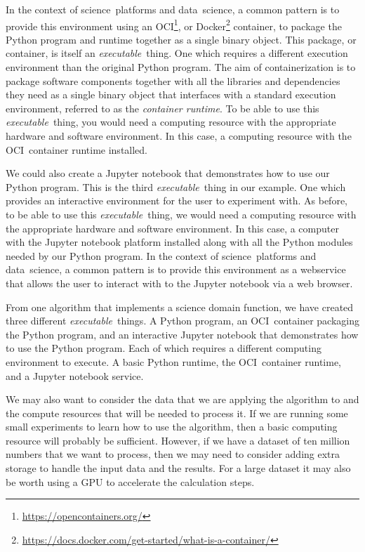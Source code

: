 \documentclass[11pt,a4paper]{ivoa}
\newcommand{\webservice} {webservice}
\newcommand{\webbrowser} {web browser}
\newcommand{\jupyternotebook} {Jupyter notebook}
\newcommand{\python} {Python}
\newcommand{\pythonprogram} {Python program}
\newcommand{\ocicontainer} {OCI~container}
\newcommand{\footurl}[1] {\footnote{\url{#1}}}
\newcommand{\dataset} {dataset}
\newcommand{\datascience} {data~science}
\newcommand{\scienceplatform} {science~platform}
\newcommand{\executablething} {\textit{executable}~thing}
\newcommand{\gpu} {GPU}
\begin{document}
In the context of \scienceplatform{}s and \datascience{}, a common pattern is to provide this environment
using an OCI\footurl{https://opencontainers.org/},
or Docker\footurl{https://docs.docker.com/get-started/what-is-a-container/} container,
to package the \pythonprogram{} and runtime together as a single binary object.
This package, or container, is itself an \executablething{}. One which requires a different execution
environment than the original \pythonprogram{}.
The aim of containerization is to package software components together with all the libraries and dependencies
they need as a single binary object that interfaces with a standard execution environment,
referred to as the \textit{container runtime}.
To be able to use this \executablething{}, you would need a computing resource with the appropriate
hardware and software environment. In this case, a computing resource with the \ocicontainer{} runtime installed.

We could also create a \jupyternotebook{} that demonstrates how to use our \pythonprogram{}.
This is the third \executablething{} in our example.
One which provides an interactive environment for the user to experiment with.
As before, to be able to use this \executablething{}, we would need a computing resource with
the appropriate hardware and software environment.
In this case, a computer with the \jupyternotebook{} platform installed along with all the \python{} modules
needed by our \pythonprogram{}.
In the context of \scienceplatform{}s and \datascience{}, a common pattern is to provide this environment as a \webservice{}
that allows the user to interact with to the \jupyternotebook{} via a \webbrowser.

From one algorithm that implements a science domain function, we have created three different \executablething{}s.
A \pythonprogram{}, an \ocicontainer{} packaging the \pythonprogram{}, and an interactive \jupyternotebook{}
that demonstrates how to use the \pythonprogram{}.
Each of which requires a different computing environment to execute.
A basic \python{} runtime, the \ocicontainer{} runtime, and a \jupyternotebook{} service.

We may also want to consider the data that we are applying the algorithm to and the compute resources that
will be needed to process it.
If we are running some small experiments to learn how to use the algorithm, then a basic computing
resource will probably be sufficient.
However, if we have a \dataset{} of ten million numbers that we want to process, then we may
need to consider adding extra storage to handle the input data and the results.
For a large \dataset{} it may also be worth using a \gpu{} to accelerate the calculation steps.
\end{document}
